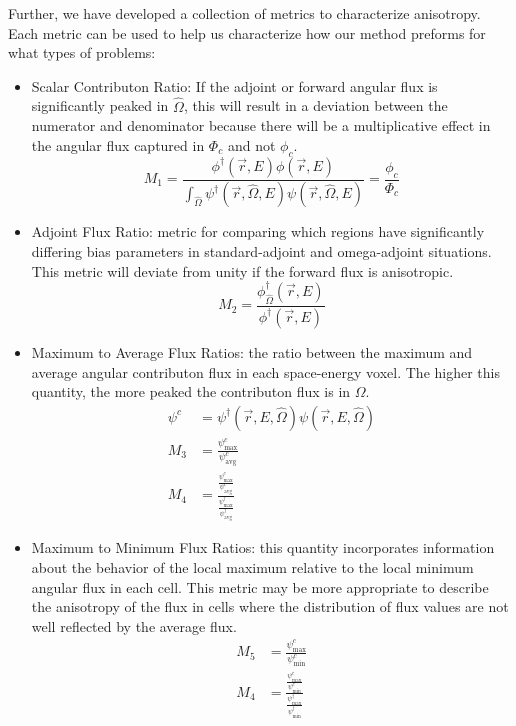 \documentclass[12pt]{article}
\newcommand{\vOmega}{\ensuremath{\hat{\Omega}}}
\newcommand{\vecr}{\ensuremath{\vec{r}}}
\begin{document}
\begin{enumerate}
Further, we have developed a collection of metrics to characterize anisotropy. 
Each metric can be used to help us characterize how our method preforms for what types of problems:
\vspace*{-.5em}
      \begin{itemize}
      \item Scalar Contributon Ratio: If the adjoint or forward angular flux is significantly peaked in $\vOmega$, this will result in a deviation between the numerator and denominator because there will be a multiplicative effect in the angular flux captured in $\Phi_{c}$ and not $\phi_{c}$.
      \[M_{1} = \frac{\phi^{\dagger}(\vecr,E)\phi(\vecr,E)}{\int_{\vOmega}\psi^{\dagger}(\vecr,\vOmega,E)\psi(\vecr,\vOmega,E)} = \frac{\phi_{c}}{\Phi_{c}}\]
      
      \item Adjoint Flux Ratio: metric for comparing which regions have significantly differing bias parameters in standard-adjoint and omega-adjoint situations. This metric will deviate from unity if the forward flux is anisotropic.
      \[M_{2} = \frac{\phi^{\dagger}_{\vOmega}(\vecr,E)}{\phi^{\dagger}(\vecr,E)}\]
      
      \item Maximum to Average Flux Ratios: the ratio between the maximum and average angular contributon flux in each space-energy voxel. The higher this quantity, the more peaked the contributon flux is in $\Omega$. 
      \begin{align*}
      \psi^{c} &= \psi^{\dagger}(\vecr,E, \vOmega)\psi(\vecr,E, \vOmega)\\
      M_{3} &= \frac{\psi^c_{\max}}{\psi^{c}_{\text{avg}}}\\
      M_{4} &=  \frac{\frac{\psi^{c}_{\max}}{\psi^{c}_{\text{avg}}}}{\frac{\psi^{\dagger}_{\max}}{\psi^{\dagger}_{\text{avg}}}} 
      \end{align*} 
      
       \item Maximum to Minimum Flux Ratios: this quantity incorporates information about the behavior of the local maximum relative to the local minimum angular flux in each cell. This metric may be more appropriate to describe the anisotropy of the flux in cells where the distribution of flux values are not well reflected by the average flux.
       \begin{align*}
      M_{5} &= \frac{\psi^c_{\max}}{\psi^{c}_{\min}}\\
      M_{4} &=  \frac{\frac{\psi^{c}_{\max}}{\psi^{c}_{\min}}}{\frac{\psi^{\dagger}_{\max}}{\psi^{\dagger}_{\min}}}
       \end{align*}
      \end{itemize} 


\end{enumerate}
\end{document}
